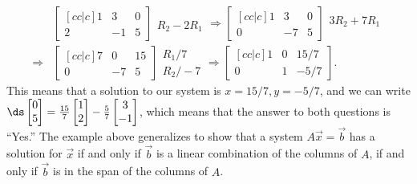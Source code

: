 \begin{align*}
   &\begin{bmatrix}[cc|c]1&3& 0\\2&-1&5\end{bmatrix}\begin{array}{l}\\ R_2-2R_1\end{array}
 \Rightarrow 
   \begin{bmatrix}[cc|c]1&3& 0\\0&-7&5\end{bmatrix} \begin{array}{l} 3R_2+7R_1\\ \ \end{array}\\
 \Rightarrow 
   &\begin{bmatrix}[cc|c]7&0& 15\\0&-7&5\end{bmatrix} \begin{array}{l}R_1/7\\ R_2/-7\end{array}
 \Rightarrow 
   \begin{bmatrix}[cc|c]1&0& 15/7\\0&1&-5/7\end{bmatrix}.
\end{align*}
This means that a solution to our system is $x=15/7, y=-5/7$, and we can write $\ds\begin{bmatrix} 0\\5\end{bmatrix} = \frac{15}{7}\begin{bmatrix} 1\\2\end{bmatrix}-\frac{5}{7}\begin{bmatrix} 3\\-1\end{bmatrix}$, which means that the answer to both questions is ``Yes.''  The example above generalizes to show that a system $A \vec x = \vec b$ has a solution for $\vec x$ if and only if $\vec b$ is a linear combination of the columns of $A$, if and only if $\vec b$ is in the span of the columns of $A$.





